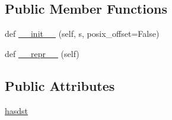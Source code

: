 \subsection*{Public Member Functions}
\begin{DoxyCompactItemize}
\item 
def \hyperlink{classdateutil_1_1tz_1_1tz_1_1tzstr_a69e92dce6740e41325a7a1b03a632a2f}{\+\_\+\+\_\+init\+\_\+\+\_\+} (self, s, posix\+\_\+offset=False)
\item 
def \hyperlink{classdateutil_1_1tz_1_1tz_1_1tzstr_a5bd0aa894d8dffbcff503e5d4f15eeac}{\+\_\+\+\_\+repr\+\_\+\+\_\+} (self)
\end{DoxyCompactItemize}
\subsection*{Public Attributes}
\begin{DoxyCompactItemize}
\item 
\hyperlink{classdateutil_1_1tz_1_1tz_1_1tzstr_aad9666c7b79662b78a1fc66a8ce0f215}{hasdst}
\end{DoxyCompactItemize}


